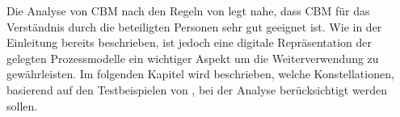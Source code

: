 Die Analyse von CBM nach den Regeln von \citet{MENDLING2010127} legt nahe, dass CBM für das Verständnis durch die beteiligten Personen sehr gut geeignet ist. Wie in der Einleitung bereits beschrieben, ist jedoch eine digitale Repräsentation der gelegten Prozessmodelle ein wichtiger Aspekt um die Weiterverwendung zu gewährleisten. Im folgenden Kapitel wird beschrieben, welche Konstellationen, basierend auf den Testbeispielen von \citet{max}, bei der Analyse berücksichtigt werden sollen.

